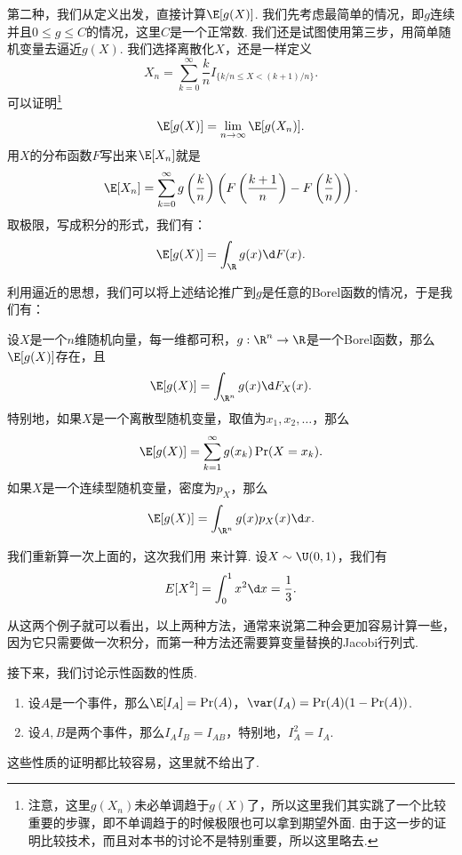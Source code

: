 第二种，我们从定义出发，直接计算$\E[g(X)]$. 我们先考虑最简单的情况，即$g$连续并且$0\leq g\leq C$的情况，这里$C$是一个正常数. 我们还是试图使用第三步，用简单随机变量去逼近$g(X)$. 我们选择离散化$X$，还是一样定义
\[X_n=\sum_{k=0}^\infty\frac{k}{n}I_{\{k/n\leq X<(k+1)/n\}}.\]
可以证明\footnote{注意，这里$g(X_n)$未必单调趋于$g(X)$了，所以这里我们其实跳了一个比较重要的步骤，即不单调趋于的时候极限也可以拿到期望外面. 由于这一步的证明比较技术，而且对本书的讨论不是特别重要，所以这里略去. }
\[\E[g(X)]=\lim_{n\to\infty}\E[g(X_n)].\]
用$X$的分布函数$F$写出来$\E[X_n]$就是
\begin{align*}
    \E[X_n]=\sum_{k=0}^\infty g\left(\frac{k}{n}\right)\left(F\left(\frac{k+1}{n}\right)-F\left(\frac{k}{n}\right)\right).
\end{align*}
取极限，写成积分的形式，我们有：
\[\E[g(X)]=\int_{\R} g(x)\d F(x).\]

利用逼近的思想，我们可以将上述结论推广到$g$是任意的Borel函数的情况，于是我们有：

\begin{theorem}\label{thm:expectation-function}
设$X$是一个$n$维随机向量，每一维都可积，$g:\R^n\to\R$是一个Borel函数，那么$\E[g(X)]$存在，且
\[\E[g(X)]=\int_{\R^n} g(x)\d F_X(x).\]
特别地，如果$X$是一个离散型随机变量，取值为$x_1,x_2,\dots$，那么
\[\E[g(X)]=\sum_{k=1}^\infty g(x_k)\Pr(X=x_k).\]
如果$X$是一个连续型随机变量，密度为$p_X$，那么
\[\E[g(X)]=\int_{\R^n} g(x)p_X(x)\d x.\]
\end{theorem}

\begin{example}
我们重新算一次上面的，这次我们用 来计算. 设$X\sim\U(0,1)$，我们有
\[E[X^2]=\int_0^1 x^2\d x=\frac{1}{3}.\]
\end{example}

从这两个例子就可以看出，以上两种方法，通常来说第二种会更加容易计算一些，因为它只需要做一次积分，而第一种方法还需要算变量替换的Jacobi行列式. 

接下来，我们讨论示性函数的性质. 

\begin{proposition}\label{prop:expectation-indicator}
\begin{enumerate}
    \item 设$A$是一个事件，那么$\E[I_A]=\Pr(A)$，$\var(I_A)=\Pr(A)(1-\Pr(A))$.
    \item 设$A,B$是两个事件，那么$I_AI_B=I_{AB}$，特别地，$I_A^2=I_A$.
\end{enumerate}
\end{proposition}
这些性质的证明都比较容易，这里就不给出了. 

